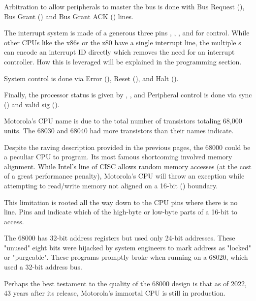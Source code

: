 Arbitration to allow peripherals to master the bus is done with Bus Request (),  Bus Grant () and Bus Grant ACK () lines.

The interrupt system is made of a generous three pins , , , and  for control. While other CPUs like the x86s or the z80 have a single interrupt line, the multiple s can encode an interrupt ID directly which removes the need for an interrupt controller. How this is leveraged will be explained in the programming section.

System control is done via Error (), Reset (), and Halt (). 

Finally, the processor status is given by , ,  and Peripheral control is done via sync () and valid sig ().

\begin{trivia}
Motorola's CPU name is due to the total number of transistors totaling 68,000 units. The 68030 and 68040 had more transistors than their names indicate. 
\end{trivia}

Despite the raving description provided in the previous pages, the 68000 could be a peculiar CPU to program. Its most famous shortcoming involved memory alignment. While Intel's line of CISC allows random memory accesses (at the cost of a great performance penalty), Motorola's CPU will throw an  exception while attempting to read/write memory not aligned on a 16-bit () boundary.

This limitation is rooted all the way down to the CPU pins where there is no  line. Pins  and indicate which of the high-byte or low-byte parts of a 16-bit  to access.


\begin{trivia}
 The 68000 has 32-bit address registers but used only 24-bit addresses. These "unused" eight bits were hijacked by system engineers to mark address as "locked" or "purgeable". These programs promptly broke when running on a 68020, which used a 32-bit address bus. 
\end{trivia}

Perhaps the best testament to the quality of the 68000 design is that as of 2022, 43 years after its release, Motorola's immortal CPU is still in production.


